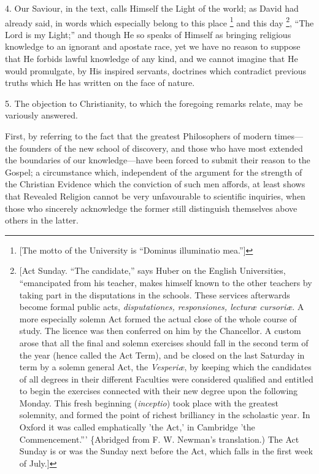 4. Our Saviour, in the text, calls Himself the Light of the world;
as David had already said, in words which especially belong to this
place \footnote{[The motto of the University is ``Dominus illuminatio
mea.'']} and this day \footnote{[Act Sunday. ``The candidate,'' says
Huber on the English Universities, ``emancipated from his teacher,
makes himself known to the other teachers by taking part in the
disputations in the schools. These services afterwards become formal
public acts, \emph{disputationes, responsiones, lecturæ cursoriæ}. A
more especially solemn Act formed the actual close of the whole course
of study. The licence was then conferred on him by the Chancellor. A
custom arose that all the final and solemn exercises should fall in
the second term of the year (hence called the Act Term), and be closed
on the last Saturday in term by a solemn general Act, the \emph{Vesperiæ},
by keeping which the candidates of all degrees in their different
Faculties were considered qualified and entitled to begin the
exercises connected with their new degree upon the following Monday.
This fresh beginning (\emph{inceptio}) took place with the greatest
solemnity, and formed the point of richest brilliancy in the
scholastic year. In Oxford it was called emphatically 'the Act,' in
Cambridge 'the Commencement.''' \{Abridged from F. W. Newman's
translation.) The Act Sunday is or was the Sunday next before the Act,
which falls in the first week of July.]}, ``The Lord is my Light;'' and though He so speaks of
Himself as bringing religious knowledge to an ignorant and apostate
race, yet we have no reason to suppose that He forbids lawful
knowledge of any kind, and we cannot imagine that He would promulgate,
by His inspired servants, doctrines which contradict previous truths
which He has written on the face of nature.

5. The objection to Christianity, to which the foregoing remarks
relate, may be variously answered.

First, by referring to the fact that the greatest Philosophers of
modern times—the founders of the new school of discovery, and those
who have most extended the boundaries of our knowledge—have been
forced to submit their reason to the Gospel; a circumstance which,
independent of the argument for the strength of the Christian Evidence
which the conviction of such men affords, at least shows that Revealed
Religion cannot be very unfavourable to scientific inquiries, when
those who sincerely acknowledge the former still distinguish
themselves above others in the latter.


